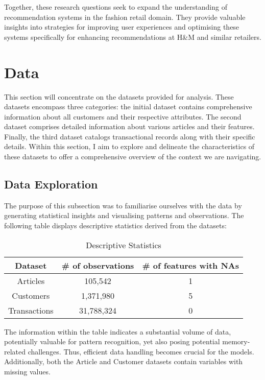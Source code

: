 \documentclass[conference,compsoc]{IEEEtran}
\begin{document}
Together, these research questions seek to expand the understanding of recommendation systems in the fashion retail domain. They provide valuable insights into strategies for improving user experiences and optimising these systems specifically for enhancing recommendations at H\&M and similar retailers.

\section{Data}

This section will concentrate on the datasets provided for analysis. These datasets encompass three categories: the initial dataset contains comprehensive information about all customers and their respective attributes. The second dataset comprises detailed information about various articles and their features. Finally, the third dataset catalogs transactional records along with their specific details. Within this section, I aim to explore and delineate the characteristics of these datasets to offer a comprehensive overview of the context we are navigating.

\subsection{Data Exploration}

The purpose of this subsection was to familiarise ourselves with the data by generating statistical insights and visualising patterns and observations. The following table displays descriptive statistics derived from the datasets:
\begin{table}[htbp]
    \centering
    \caption{Descriptive Statistics}
    \begin{tabular}{|c|c|c|}
        \hline
        Dataset & \# of observations & \# of features with NAs \\
        \hline
        Articles & 105,542 & 1 \\
        Customers & 1,371,980 & 5 \\
        Transactions & 31,788,324 & 0 \\
        \hline
    \end{tabular}
    \label{tab:example}
\end{table}

The information within the table indicates a substantial volume of data, potentially valuable for pattern recognition, yet also posing potential memory-related challenges. Thus, efficient data handling becomes crucial for the models. Additionally, both the Article and Customer datasets contain variables with missing values.
\end{document}
